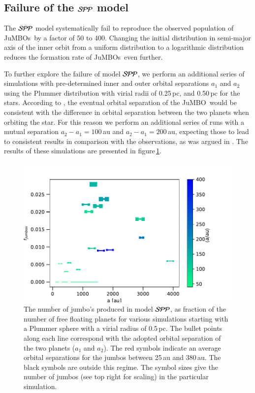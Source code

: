 \documentclass[submission,phys]{lib/SciPost}
\newcommand{\jumbo}{\mbox{JuMBO}}
\newcommand{\jumbos}{\mbox{JuMBOs}}
\begin{document}
\subsection{Failure of the ${\cal SPP}$ model}

The ${\cal SPP}$ model systematically fail to reproduce the observed
population of \jumbos\, by a factor of 50 to 400. Changing the initial
distribution in semi-major axis of the inner orbit from a uniform
distribution to a logarithmic distribution reduces the formation rate
of \jumbos\, even further.

To further explore the failure of model ${\cal SPP}$, we perform an
additional series of simulations with pre-determined inner and outer
orbital separations $a_1$ and $a_2$ using the Plummer distribution
with virial radii of 0.25\,pc, and 0.50\,pc for the stars.  According
to \cite{2023arXiv231006016W}, the eventual orbital separation of the
\jumbo\, would be consistent with the difference in orbital separation
between the two planets when orbiting the star. For this reason we
perform an additional series of runs with a mutual separation $a_2-a_1
= 100$\,au and $a_2-a_1 = 200$\,au, expecting those to lead to
consistent results in comparison with the observations, as was argued
in \cite{2023arXiv231006016W}.  The results of these simulations are
presented in figure\,\ref{Fig:fjumbos_from_PP}.

\begin{figure}
    \centering
        \includegraphics[width=.91\columnwidth]{figures/fig_fjumbos_from_psystems.pdf}
        \caption{The number of jumbo's produced in model ${\cal SPP}$,
          as fraction of the number of free floating planets for
          various simulations starting with a Plummer sphere with a
          virial radius of 0.5\,pc.  The bullet points along each line
          correspond with the adopted orbital separation of the two
          planets ($a_1$ and $a_2$).  The red symbols indicate an
          average orbital separations for the jumbos between 25\,au
          and 380\,au.  The black symbols are outside this regime.
          The symbol sizes give the number of jumbos (see top right
          for scaling) in the particular simulation.  }
         \label{Fig:fjumbos_from_PP}
\end{figure}
\end{document}
